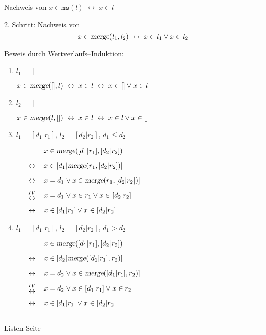 
\begin{slide}{}
\normalsize

\begin{center}
Nachweis von $x \in \texttt{ms}(l) \;\leftrightarrow\; x \in l$
\end{center}
\vspace*{0.5cm}

\footnotesize
2. Schritt: Nachweis von
 $$x\in \textsl{merge}(l_1, l_2) \;\leftrightarrow\; x \in l_1 \vee x \in l_2$$

Beweis durch Wertverlaufs--Induktion:
\begin{enumerate}
\item $l_1 = []$

      $x\in \textsl{merge}([], l) \;\leftrightarrow\; x \in l \;\leftrightarrow\; x \in [] \vee x \in l$
\item $l_2 = []$

      $x\in \textsl{merge}(l, []) \;\leftrightarrow\; x \in l \;\leftrightarrow\; x \in l \vee x \in []$
\item $l_1 = [d_1|r_1]$,  $l_2 = [d_2|r_2]$, $d_1 \leq d_2$

      $
      \begin{array}{lcl}
      &                 & x \in \textsl{merge}([d_1|r_1], [d_2|r_2]) \\[0.3cm]
      & \leftrightarrow & x \in [d_1 | \textsl{merge}(r_1, [d_2|r_2])] \\[0.3cm]
      & \leftrightarrow & x = d_1 \vee x \in \textsl{merge}(r_1, [d_2|r_2])] \\[0.3cm]
      & {IV \atop \displaystyle\leftrightarrow} & x = d_1 \vee x \in r_1 \vee x \in [d_2|r_2] \\[0.3cm]
      & \leftrightarrow & x \in [d_1| r_1] \vee x \in [d_2|r_2] 
      \end{array}
      $
\item $l_1 = [d_1|r_1]$,  $l_2 = [d_2|r_2]$, $d_1 > d_2$

      $
      \begin{array}{lcl}
      &                 & x \in \textsl{merge}([d_1|r_1], [d_2|r_2]) \\[0.3cm]
      & \leftrightarrow & x \in [d_2 | \textsl{merge}([d_1|r_1], r_2)] \\[0.3cm]
      & \leftrightarrow & x = d_2 \vee x \in \textsl{merge}([d_1|r_1], r_2)] \\[0.3cm]
      & {IV \atop \displaystyle\leftrightarrow} & x = d_2 \vee x \in [d_1|r_1] \vee x \in r_2 \\[0.3cm]
      & \leftrightarrow & x \in [d_1| r_1] \vee x \in [d_2|r_2] 
      \end{array}
      $
\end{enumerate}

\vspace*{\fill}
\tiny \addtocounter{mypage}{1}
\rule{17cm}{1mm}
Listen  \hspace*{\fill} Seite 
\end{slide}

